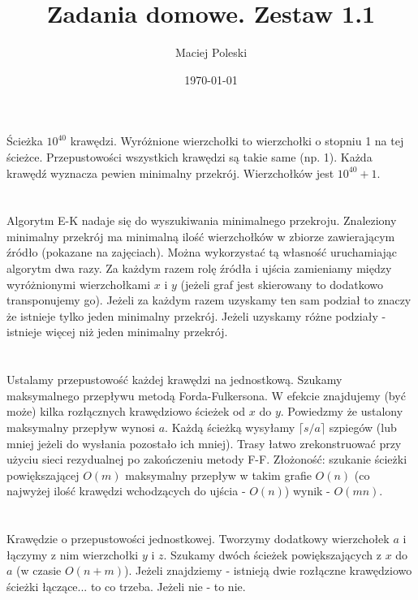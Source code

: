 \documentclass[a4paper,12pt]{article}
\title{Zadania domowe. Zestaw 1.1}
\author{Maciej Poleski}
\date{\today}
\begin{document}
\maketitle

\newpage

\section{}
Ścieżka $10^{40}$ krawędzi. Wyróżnione wierzchołki to wierzchołki o stopniu 1 na tej ścieżce. Przepustowości wszystkich krawędzi są takie same (np. 1). Każda krawędź wyznacza pewien minimalny przekrój. Wierzchołków jest $10^{40}+1$.
\section{}
\section{}
Algorytm E-K nadaje się do wyszukiwania minimalnego przekroju. Znaleziony minimalny przekrój ma minimalną ilość wierzchołków w zbiorze zawierającym źródło (pokazane na zajęciach). Można wykorzystać tą własność uruchamiając algorytm dwa razy. Za każdym razem rolę źródła i ujścia zamieniamy między wyróżnionymi wierzchołkami $x$ i $y$ (jeżeli graf jest skierowany to dodatkowo transponujemy go). Jeżeli za każdym razem uzyskamy ten sam podział to znaczy że istnieje tylko jeden minimalny przekrój. Jeżeli uzyskamy różne podziały - istnieje więcej niż jeden minimalny przekrój.
\section{}
Ustalamy przepustowość każdej krawędzi na jednostkową. Szukamy maksymalnego przepływu metodą Forda-Fulkersona. W efekcie znajdujemy (być może) kilka rozłącznych krawędziowo ścieżek od $x$ do $y$. Powiedzmy że ustalony maksymalny przepływ wynosi $a$. Każdą ścieżką wysyłamy $\lceil{s/a}\rceil$ szpiegów (lub mniej jeżeli do wysłania pozostało ich mniej). Trasy łatwo zrekonstruować przy użyciu sieci rezydualnej po zakończeniu metody F-F. Złożoność: szukanie ścieżki powiększającej $O(m)$ maksymalny przepływ w takim grafie $O(n)$ (co najwyżej ilość krawędzi wchodzących do ujścia - $O(n)$) wynik - $O(mn)$.
\section{}
Krawędzie o przepustowości jednostkowej. Tworzymy dodatkowy wierzchołek $a$ i łączymy z nim wierzchołki $y$ i $z$. Szukamy dwóch ścieżek powiększających z $x$ do $a$ (w czasie $O(n+m)$). Jeżeli znajdziemy - istnieją dwie rozłączne krawędziowo ścieżki łączące... to co trzeba. Jeżeli nie - to nie.
\end{document}

